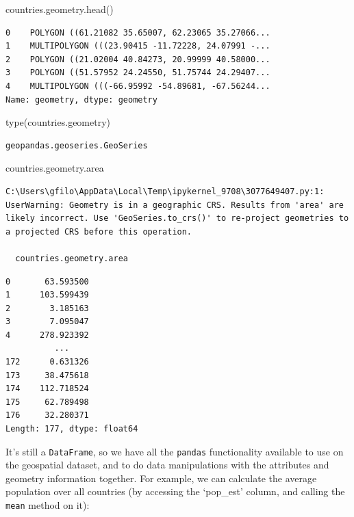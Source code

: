 \documentclass[
  letterpaper,
  DIV=11,
  numbers=noendperiod]{scrreprt}
\newenvironment{Shaded}{\begin{snugshade}}{\end{snugshade}}
\newcommand{\BuiltInTok}[1]{\textcolor[rgb]{0.00,0.23,0.31}{#1}}
\newcommand{\NormalTok}[1]{\textcolor[rgb]{0.00,0.23,0.31}{#1}}
\begin{document}
\begin{Shaded}
\begin{Highlighting}[]
\NormalTok{countries.geometry.head()}
\end{Highlighting}
\end{Shaded}

\begin{verbatim}
0    POLYGON ((61.21082 35.65007, 62.23065 35.27066...
1    MULTIPOLYGON (((23.90415 -11.72228, 24.07991 -...
2    POLYGON ((21.02004 40.84273, 20.99999 40.58000...
3    POLYGON ((51.57952 24.24550, 51.75744 24.29407...
4    MULTIPOLYGON (((-66.95992 -54.89681, -67.56244...
Name: geometry, dtype: geometry
\end{verbatim}

\begin{Shaded}
\begin{Highlighting}[]
\BuiltInTok{type}\NormalTok{(countries.geometry)}
\end{Highlighting}
\end{Shaded}

\begin{verbatim}
geopandas.geoseries.GeoSeries
\end{verbatim}

\begin{Shaded}
\begin{Highlighting}[]
\NormalTok{countries.geometry.area}
\end{Highlighting}
\end{Shaded}

\begin{verbatim}
C:\Users\gfilo\AppData\Local\Temp\ipykernel_9708\3077649407.py:1: UserWarning: Geometry is in a geographic CRS. Results from 'area' are likely incorrect. Use 'GeoSeries.to_crs()' to re-project geometries to a projected CRS before this operation.

  countries.geometry.area
\end{verbatim}

\begin{verbatim}
0       63.593500
1      103.599439
2        3.185163
3        7.095047
4      278.923392
          ...    
172      0.631326
173     38.475618
174    112.718524
175     62.789498
176     32.280371
Length: 177, dtype: float64
\end{verbatim}

It's still a \texttt{DataFrame}, so we have all the \texttt{pandas}
functionality available to use on the geospatial dataset, and to do data
manipulations with the attributes and geometry information together. For
example, we can calculate the average population over all countries (by
accessing the `pop\_est' column, and calling the \texttt{mean} method on
it):
\end{document}
